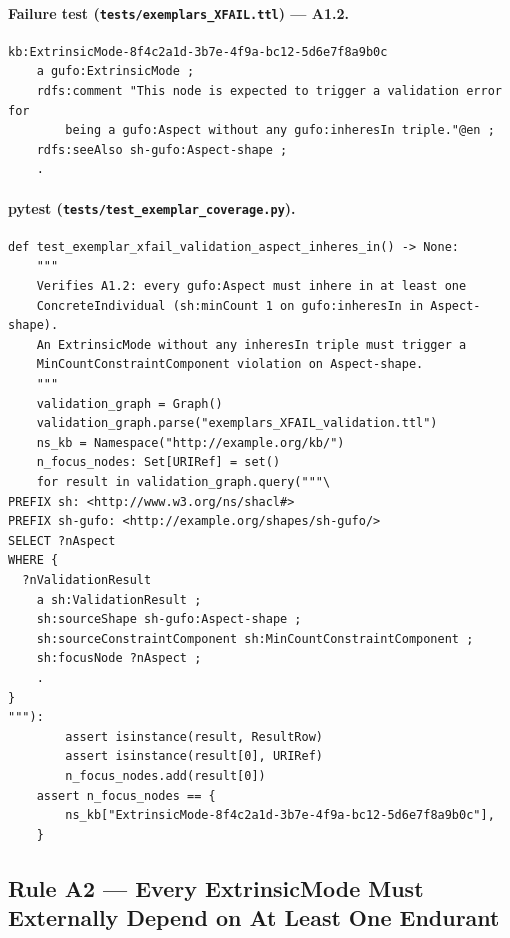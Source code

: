 \documentclass[12pt,a4paper]{article}
\begin{document}
\paragraph{Failure test (\texttt{tests/exemplars\_XFAIL.ttl}) --- A1.2.}

\begin{lstlisting}[style=turtlestyle]
kb:ExtrinsicMode-8f4c2a1d-3b7e-4f9a-bc12-5d6e7f8a9b0c
    a gufo:ExtrinsicMode ;
    rdfs:comment "This node is expected to trigger a validation error for
        being a gufo:Aspect without any gufo:inheresIn triple."@en ;
    rdfs:seeAlso sh-gufo:Aspect-shape ;
    .
\end{lstlisting}

\paragraph{pytest (\texttt{tests/test\_exemplar\_coverage.py}).}

\begin{lstlisting}[style=pythonstyle]
def test_exemplar_xfail_validation_aspect_inheres_in() -> None:
    """
    Verifies A1.2: every gufo:Aspect must inhere in at least one
    ConcreteIndividual (sh:minCount 1 on gufo:inheresIn in Aspect-shape).
    An ExtrinsicMode without any inheresIn triple must trigger a
    MinCountConstraintComponent violation on Aspect-shape.
    """
    validation_graph = Graph()
    validation_graph.parse("exemplars_XFAIL_validation.ttl")
    ns_kb = Namespace("http://example.org/kb/")
    n_focus_nodes: Set[URIRef] = set()
    for result in validation_graph.query("""\
PREFIX sh: <http://www.w3.org/ns/shacl#>
PREFIX sh-gufo: <http://example.org/shapes/sh-gufo/>
SELECT ?nAspect
WHERE {
  ?nValidationResult
    a sh:ValidationResult ;
    sh:sourceShape sh-gufo:Aspect-shape ;
    sh:sourceConstraintComponent sh:MinCountConstraintComponent ;
    sh:focusNode ?nAspect ;
    .
}
"""):
        assert isinstance(result, ResultRow)
        assert isinstance(result[0], URIRef)
        n_focus_nodes.add(result[0])
    assert n_focus_nodes == {
        ns_kb["ExtrinsicMode-8f4c2a1d-3b7e-4f9a-bc12-5d6e7f8a9b0c"],
    }
\end{lstlisting}

\subsection{Rule A2 --- Every ExtrinsicMode Must Externally Depend on At Least One Endurant}
\label{sec:rule-a2}
\end{document}
